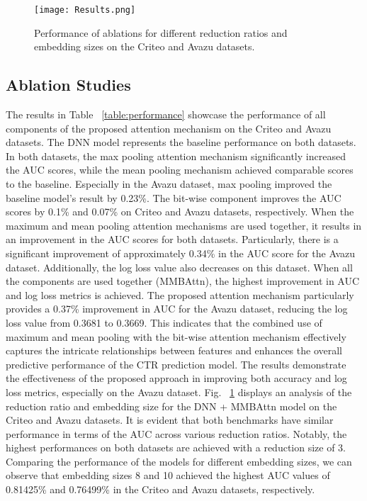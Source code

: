 \documentclass{article}
\begin{document}
\begin{figure}[ht]
\begin{center}
\texttt{[image: Results.png]}
\caption{Performance of ablations for different reduction ratios and embedding sizes on the Criteo and Avazu datasets.}
\label{fig:reduction}
\end{center}
\end{figure}

\subsection{Ablation Studies}
The results in Table ~\ref{table:performance} showcase the performance of all components of the proposed attention mechanism on the Criteo and Avazu datasets. The DNN model represents the baseline performance on both datasets. In both datasets, the max pooling attention mechanism significantly increased the AUC scores, while the mean pooling mechanism achieved comparable scores to the baseline. Especially in the Avazu dataset, max pooling improved the baseline model's result by 0.23\%. The bit-wise component improves the AUC scores by 0.1\% and 0.07\% on Criteo and Avazu datasets, respectively. When the maximum and mean pooling attention mechanisms are used together, it results in an improvement in the AUC scores for both datasets. Particularly, there is a significant improvement of approximately 0.34\% in the AUC score for the Avazu dataset. Additionally, the log loss value also decreases on this dataset.  When all the components are used together (MMBAttn), the highest improvement in AUC and log loss metrics is achieved. The proposed attention mechanism particularly provides a 0.37\% improvement in AUC for the Avazu dataset, reducing the log loss value from 0.3681 to 0.3669. This indicates that the combined use of maximum and mean pooling with the bit-wise attention mechanism effectively captures the intricate relationships between features and enhances the overall predictive performance of the CTR prediction model. The results demonstrate the effectiveness of the proposed approach in improving both accuracy and log loss metrics, especially on the Avazu dataset.
Fig. ~\ref{fig:reduction} displays an analysis of the reduction ratio and embedding size for the DNN + MMBAttn model on the Criteo and Avazu datasets. It is evident that both benchmarks have similar performance in terms of the AUC across various reduction ratios. Notably, the highest performances on both datasets are achieved with a reduction size of 3. Comparing the performance of the models for different embedding sizes, we can observe that embedding sizes 8 and 10 achieved the highest AUC values of 0.81425\% and 0.76499\% in the Criteo and Avazu datasets, respectively.
\end{document}
